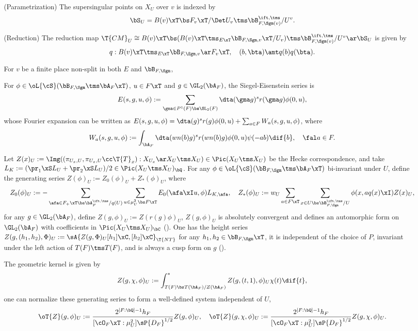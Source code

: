\documentclass[article, a4paper, twoside]{universal}
\begin{document}
\begin{stp}
\begin{itm}
        \item (Parametrization) The supersingular points on $X_{U}$ over $v$ is indexed by
        \[
            \bS_{U}=B(v)\xT\bs F_{v}\xT/\Det U_{v}\tms\bB_{F,\Sgm(v)}^{\ift,\tms}/U^{v}.
        \]
        \item (Reduction) The reduction map $\T{CM}_{U}\cong B(v)\xT\bs (B(v)\xT\tms_{E\xT}\bB_{F,\Sgm,v}\xT/U_{v})\tms \bB_{F,\Sgm(v)}^{\ift,\tms}/U^{v}\ar\bS_{U}$ is given by
        \[
            q:B(v)\xT\tms_{E\xT}\bB_{F,\Sgm,v}\ar F_{v}\xT,\quad (b,\bta)\amt q(b)q(\bta).
        \]
    \end{itm}
    For $v$ be a finite place non-split in both $E$ and $\bB_{F,\Sgm}$,
\end{stp}

\begin{stp}
    For $\phi\in\oL{\cS}(\bB_{F,\Sgm}\tms\bA_{F}\xT)$, $u\in F\xT$ and $g\in\GL_{2}(\bA_{F})$, the Siegel-Eisenstein series is
    \[
        E(s,g,u,\phi):=\sum_{\gma\in P^{1}(F)\bs\SL_{2}(F)}\dta(\gma g)^{s}r(\gma g)\phi(0,u),
    \]
    whose Fourier expansion can be written as $E(s,g,u,\phi)=\dta(g)^{s}r(g)\phi(0,u)+\sum_{a\in F}W_{a}(s,g,u,\phi)$, where
    \[
        W_{a}(s,g,u,\phi):=\int_{\bA_{F}}\dta(wn(b)g)^{s}r(wn(b)g)\phi(0,u)\psi(-ab)\dif{b},\quad \fal a\in F.
    \]

    Let $Z(x)_{U}:=\Img((\pi_{U_{x},U},\pi_{U_{x},U}\cc \T{T}_{x}):X_{U_{x}}\ar X_{U}\tms X_{U})\in\Pic(X_{U}\tms X_{U})$ be the Hecke correspondence, and take $L_{K}:=(\pr_{1}\xS L_{U}+\pr_{2}\xS L_{U})/2\in\Pic(X_{U}\tms X_{U})_{\bQ}$. For any $\phi\in\oL{\cS}(\bB_{F,\Sgm}\tms\bA_{F}\xT)$ bi-invariant under $U$, define the generating series $Z(\phi)_{U}:=Z_{0}(\phi)_{U}+Z_{*}(\phi)_{U}$, where
    \[
        Z_{0}(\phi)_{U}:=-\sum_{\afa\in F_{+}\xT\bs\bA_{F}^{\ift,\tms}/q(U)}\sum_{u\in\mu_{U}^{2}\bs F\xT}E_{0}(\afa\xI u,\phi)L_{K,\afa},\quad Z_{*}(\phi)_{U}:=w_{U}\sum_{a\in F\xT}\sum_{x\in U\bs \bB_{F,\Sgm}^{\ift,\tms}/U}\phi(x,aq(x)\xI)Z(x)_{U},
    \]
    for any $g\in\GL_{2}(\bA_{F})$, define $Z(g,\phi)_{U}:=Z(r(g)\phi)_{U}$, $Z(g,\phi)_{U}$ is absolutely convergent and defines an automorphic form on $\GL_{2}(\bA_{F})$ with coefficients in $\Pic(X_{U}\tms X_{U})_{\bC}$ (\cite[Theorem~3.17]{YZZ2013}). One has the height series $Z(g,(h_{1},h_{2}),\Phi)_{U}:=\sA{Z(g,\Phi)_{U}[h_{1}]\xC, [h_{2}]\xC}_{\T{NT}}$ for any $h_{1},h_{2}\in\bB_{F,\Sgm}\xT$, it is independent of the choice of $P$, invariant under the left action of $T(F)\tms T(F)$, and is always a cusp form on $g$ (\cite[Lemma~3.19]{YZZ2013}).

    The geometric kernel is given by
    \[
        Z(g,\chi,\phi)_{U}:=\int_{T(F)\bs T(\bA_{F})/Z(\bA_{F})}^{*}Z(g,(t,1),\phi)_{U}\chi(t)\dif{t},
    \]
    one can normalize these generating series to form a well-defined system independent of $U$,
    \[
        \oT{Z}(g,\phi)_{U}:=\frac{2^{[F:\bQ]-1}h_{F}}{[\cO_{F}\xT:\mu_{U}^{2}]\sP{D_{F}}^{1/2}}Z(g,\phi)_{U},\quad \oT{Z}(g,\chi,\phi)_{U}:=\frac{2^{[F:\bQ]-1}h_{F}}{[\cO_{F}\xT:\mu_{U}^{2}]\sP{D_{F}}^{1/2}}Z(g,\chi,\phi)_{U}.
    \]
\end{stp}
\end{document}

